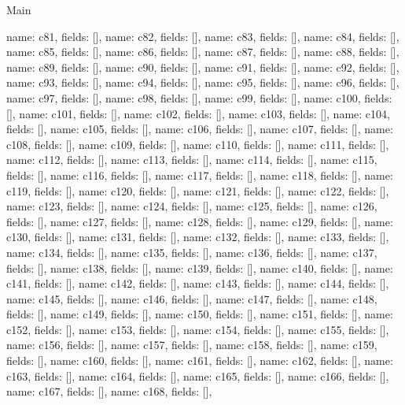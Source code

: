 \begin{lexlean}{Main}
\begin{semanticmodule}
{    {name: c81, fields: []},
    {name: c82, fields: []},
    {name: c83, fields: []},
    {name: c84, fields: []},
    {name: c85, fields: []},
    {name: c86, fields: []},
    {name: c87, fields: []},
    {name: c88, fields: []},
    {name: c89, fields: []},
    {name: c90, fields: []},
    {name: c91, fields: []},
    {name: c92, fields: []},
    {name: c93, fields: []},
    {name: c94, fields: []},
    {name: c95, fields: []},
    {name: c96, fields: []},
    {name: c97, fields: []},
    {name: c98, fields: []},
    {name: c99, fields: []},
    {name: c100, fields: []},
    {name: c101, fields: []},
    {name: c102, fields: []},
    {name: c103, fields: []},
    {name: c104, fields: []},
    {name: c105, fields: []},
    {name: c106, fields: []},
    {name: c107, fields: []},
    {name: c108, fields: []},
    {name: c109, fields: []},
    {name: c110, fields: []},
    {name: c111, fields: []},
    {name: c112, fields: []},
    {name: c113, fields: []},
    {name: c114, fields: []},
    {name: c115, fields: []},
    {name: c116, fields: []},
    {name: c117, fields: []},
    {name: c118, fields: []},
    {name: c119, fields: []},
    {name: c120, fields: []},
    {name: c121, fields: []},
    {name: c122, fields: []},
    {name: c123, fields: []},
    {name: c124, fields: []},
    {name: c125, fields: []},
    {name: c126, fields: []},
    {name: c127, fields: []},
    {name: c128, fields: []},
    {name: c129, fields: []},
    {name: c130, fields: []},
    {name: c131, fields: []},
    {name: c132, fields: []},
    {name: c133, fields: []},
    {name: c134, fields: []},
    {name: c135, fields: []},
    {name: c136, fields: []},
    {name: c137, fields: []},
    {name: c138, fields: []},
    {name: c139, fields: []},
    {name: c140, fields: []},
    {name: c141, fields: []},
    {name: c142, fields: []},
    {name: c143, fields: []},
    {name: c144, fields: []},
    {name: c145, fields: []},
    {name: c146, fields: []},
    {name: c147, fields: []},
    {name: c148, fields: []},
    {name: c149, fields: []},
    {name: c150, fields: []},
    {name: c151, fields: []},
    {name: c152, fields: []},
    {name: c153, fields: []},
    {name: c154, fields: []},
    {name: c155, fields: []},
    {name: c156, fields: []},
    {name: c157, fields: []},
    {name: c158, fields: []},
    {name: c159, fields: []},
    {name: c160, fields: []},
    {name: c161, fields: []},
    {name: c162, fields: []},
    {name: c163, fields: []},
    {name: c164, fields: []},
    {name: c165, fields: []},
    {name: c166, fields: []},
    {name: c167, fields: []},
    {name: c168, fields: []},
}
\end{semanticmodule}
\end{lexlean}
